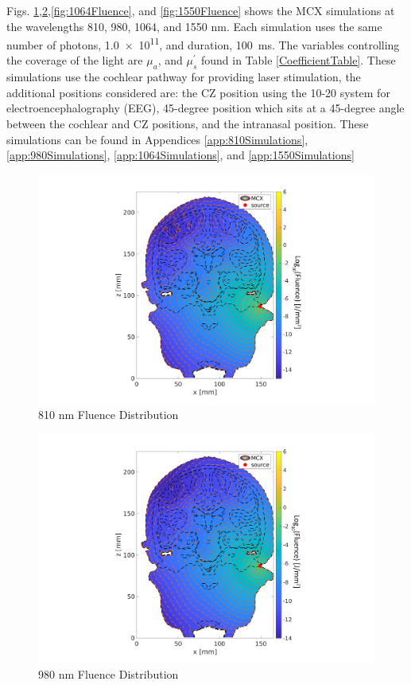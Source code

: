\documentclass[journal,twoside,web]{ieeecolor}
\begin{document}
Figs. \ref{fig:810Fluence},\ref{fig:980Fluence},\ref{fig:1064Fluence}, and \ref{fig:1550Fluence} shows the MCX simulations at the wavelengths 810, 980, 
1064, and 1550 nm. Each simulation uses the same number of photons, \num{1.0e11}, and duration, \SI{100}{\milli\second}. The variables controlling the 
coverage of the light are $\mu_{a}$, and $\mu_{s}^{'}$ found in Table \ref{CoefficientTable}. These simulations use the cochlear pathway for providing laser 
stimulation, the additional positions considered are: the CZ position using the 10-20 system for electroencephalography (EEG), 45-degree position 
which sits at a 45-degree angle between the cochlear and CZ positions, and the intranasal position. These simulations can be found 
in Appendices \ref{app:810Simulations}, \ref{app:980Simulations}, \ref{app:1064Simulations}, and \ref{app:1550Simulations}

\begin{figure}[hbt!]
    \includegraphics[width=\linewidth]{Figures/Fluence_Distribution_810nm_Cochlear.png}
    \caption{810 nm Fluence Distribution}
    \label{fig:810Fluence}
\end{figure}

\begin{figure}[hbt!]
    \includegraphics[width=\linewidth]{Figures/Fluence_Distribution_980nm_Cochlear.png}
    \caption{980 nm Fluence Distribution}
    \label{fig:980Fluence}
\end{figure}
\end{document}
